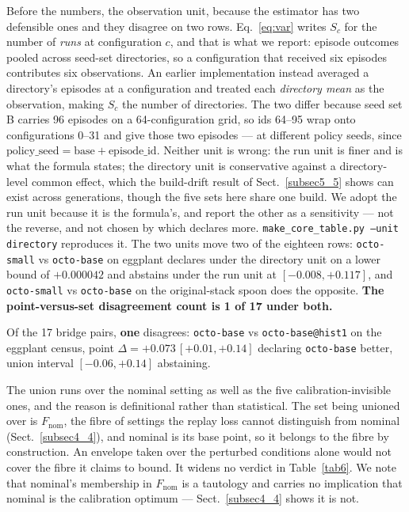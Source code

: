 \documentclass[pdflatex,iicol,sn-apa]{sn-jnl}
\theoremstyle{remark}
\begin{document}
Before the numbers, the observation unit, because the estimator has two defensible ones and they
disagree on two rows. Eq.~\eqref{eq:var} writes $S_c$ for the number of \emph{runs} at
configuration $c$, and that is what we report: episode outcomes pooled across seed-set directories,
so a configuration that received six episodes contributes six observations. An earlier
implementation instead averaged a directory's episodes at a configuration and treated each
\emph{directory mean} as the observation, making $S_c$ the number of directories. The two differ
because seed set B carries 96 episodes on a 64-configuration grid, so ids 64--95 wrap onto
configurations 0--31 and give those two episodes --- at different policy seeds, since
$\text{policy\_seed} = \text{base} + \text{episode\_id}$. Neither unit is wrong: the run unit is
finer and is what the formula states; the directory unit is conservative against a directory-level
common effect, which the build-drift result of Sect.~\ref{subsec5_5} shows can exist across
generations, though the five sets here share one build. We adopt the run unit because it is the
formula's, and report the other as a sensitivity --- not the reverse, and not chosen by which
declares more. \texttt{make\_core\_table.py --unit directory} reproduces it. The two units move two
of the eighteen rows: \texttt{octo-small} vs \texttt{octo-base} on eggplant declares under the
directory unit on a lower bound of $+0.000042$ and abstains under the run unit at
$[-0.008, +0.117]$, and \texttt{octo-small} vs \texttt{octo-base} on the original-stack spoon does
the opposite. \textbf{The point-versus-set disagreement count is 1 of 17 under both.}

Of the 17 bridge pairs, \textbf{one} disagrees: \texttt{octo-base} vs \texttt{octo-base@hist1} on the
eggplant census, point $\Delta = +0.073\,[+0.01, +0.14]$ declaring \texttt{octo-base} better, union
interval $[-0.06, +0.14]$ abstaining.

The union runs over the nominal setting as well as the five calibration-invisible ones, and the
reason is definitional rather than statistical. The set being unioned over is $F_{\mathrm{nom}}$,
the fibre of settings the replay loss cannot distinguish from nominal (Sect.~\ref{subsec4_4}), and
nominal is its base point, so it belongs to the fibre by construction. An envelope taken over the
perturbed conditions alone would not cover the fibre it claims to bound. It widens no verdict in
Table~\ref{tab6}. We note that nominal's membership in $F_{\mathrm{nom}}$ is a tautology and carries
no implication that nominal is the calibration optimum --- Sect.~\ref{subsec4_4} shows it is not.
\end{document}
